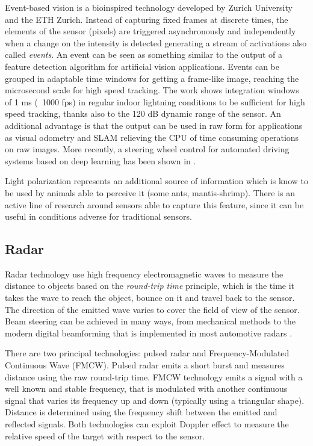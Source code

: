 Event-based vision is a bioinspired technology developed by Zurich University
and the ETH Zurich. Instead of capturing fixed frames at discrete times, the
elements of the sensor (pixels) are triggered asynchronously and independently
when a change on the intensity is detected generating a stream of activations
also called \emph{events}. 
An event can be seen as something similar to the output of a feature detection 
algorithm for artificial vision applications.
Events can be grouped in adaptable time windows for getting a frame-like image,
reaching the microsecond scale for high speed tracking. 
The work \cite{Mueggler2014} shows integration windows of 1 ms (~1000 fps) in
regular indoor lightning conditions to be sufficient for high speed tracking, 
thanks also to the 120 dB dynamic range of the sensor.
An additional advantage is that the output can be used in raw form for 
applications as visual odometry \cite{Censi2014} and SLAM \cite{Vidal2017}
relieving the CPU of time consuming operations on raw images.
More recently, a steering wheel control for automated driving systems 
based on deep learning has been shown in \cite{Maqueda2018}.

Light polarization represents an additional source of information which
is know to be used by animals able to perceive it (some ants, 
mantis-shrimp). There is an active line of research \cite{Garcia2018}
around sensors able  to capture this feature, since it can be useful in
conditions adverse for traditional sensors.
 

\subsection{Radar}

Radar technology use high frequency electromagnetic waves to measure the
distance to objects based on the \emph{round-trip time} principle, which is the
time it takes the wave to reach the object, bounce on it and travel back to the
sensor. The direction of the emitted wave varies to cover the field of view of 
the sensor. Beam steering can be achieved in many ways, from mechanical methods
to the modern digital beamforming that is implemented in most automotive radars
\cite{Hasch2015}.
 
There are two principal technologies: pulsed radar and Frequency-Modulated
Continuous Wave (FMCW). Pulsed radar emits a short burst and measures distance
using the raw round-trip time. FMCW technology emits a signal with a well known
and stable frequency, that is modulated with another continuous signal that
varies its frequency up and down (typically using a triangular shape).
Distance is determined using the frequency shift between the emitted and 
reflected signals. 
Both technologies can exploit Doppler effect to measure the relative speed of 
the target with respect to the sensor. 

